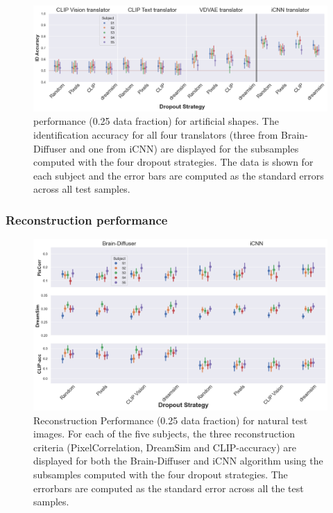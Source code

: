 \begin{figure}[ht]
  \centering
  \includegraphics[width=1\textwidth]{plots/dropout_eval_translator_art.png}
  \caption[Experiment 1: Translator performance for artificial shapes]{ performance (0.25 data fraction) for artificial shapes. The identification accuracy for all four translators (three from Brain-Diffuser and one from iCNN) are displayed for the subsamples computed with the four dropout strategies. The data is shown for each subject and the error bars are computed as the standard errors across all test samples.}\label{fig:dropout_eval_translator_art}
\end{figure}


\subsubsection{Reconstruction performance}

\begin{figure}[ht]
  \centering
  \includegraphics[width=1\textwidth]{plots/dropout_eval_reconstruction_test.png}
  \caption[Experiment 1: Reconstruction performance for natural test images]{Reconstruction Performance (0.25 data fraction) for natural test images. For each of the five subjects, the three reconstruction criteria (PixelCorrelation, DreamSim and CLIP-accuracy) are displayed for both the Brain-Diffuser and iCNN algorithm using the subsamples computed with the four dropout strategies. The errorbars are computed as the standard error across all the test samples.}\label{fig:dropout_eval_reconstruction_test}
\end{figure}

